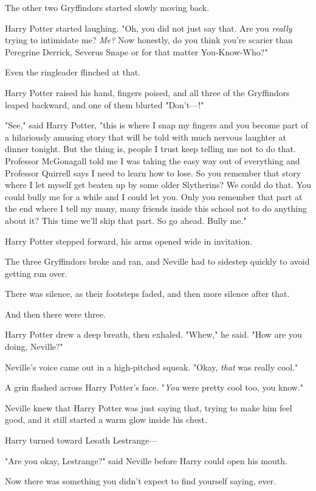The other two Gryffindors started slowly moving back.

Harry Potter started laughing. "Oh, you did not just say that. Are you 
\emph{really} trying to intimidate me? \emph{Me?} Now honestly, do you think 
you're scarier than Peregrine Derrick, Severus Snape or for that matter 
You-Know-Who?"

Even the ringleader flinched at that.

Harry Potter raised his hand, fingers poised, and all three of the Gryffindors 
leaped backward, and one of them blurted "Don't---!"

"See," said Harry Potter, "this is where I snap my fingers and you become part 
of a hilariously amusing story that will be told with much nervous laughter at 
dinner tonight. But the thing is, people I trust keep telling me not to do 
that. Professor McGonagall told me I was taking the easy way out of everything 
and Professor Quirrell says I need to learn how to lose. So you remember that 
story where I let myself get beaten up by some older Slytherins? We could do 
that. You could bully me for a while and I could let you. Only you remember 
that part at the end where I tell my many, many friends inside this school not 
to do anything about it? This time we'll skip that part. So go ahead. Bully me."

Harry Potter stepped forward, his arms opened wide in invitation.

The three Gryffindors broke and ran, and Neville had to sidestep quickly to 
avoid getting run over.

There was silence, as their footsteps faded, and then more silence after that.

And then there were three.

Harry Potter drew a deep breath, then exhaled. "Whew," he said. "How are you 
doing, Neville?"

Neville's voice came out in a high-pitched squeak. "Okay, \emph{that} was 
really cool."

A grin flashed across Harry Potter's face. "\emph{You} were pretty cool too, 
you know."

Neville knew that Harry Potter was just saying that, trying to make him feel 
good, and it still started a warm glow inside his chest.

Harry turned toward Lesath Lestrange---

"Are you okay, Lestrange?" said Neville before Harry could open his mouth.

Now there was something you didn't expect to find yourself saying, ever.

